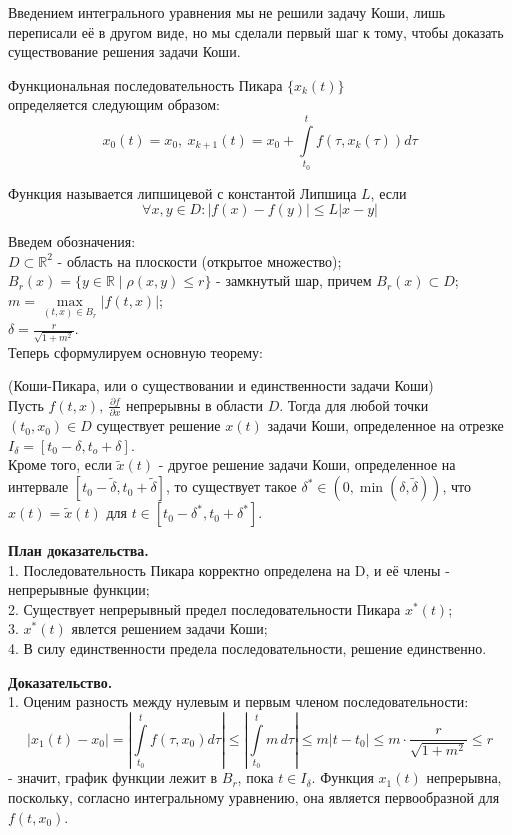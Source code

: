 Введением интегрального уравнения мы не решили задачу Коши, лишь
переписали её в другом виде, но мы сделали первый шаг к тому, чтобы 
доказать существование решения задачи Коши.
\begin{defin}
Функциональная последовательность Пикара $\{x_k(t)\}$\\
определяется следующим образом:  
$$x_0(t)=x_0,~x_{k+1}(t)=x_0+\int\limits_{t_0}^{t}f(\tau,x_k(\tau))d\tau$$
\end{defin}
\begin{defin}
Функция называется липшицевой с константой Липшица $L$, если
 $$\forall x,y \in D:|f(x)-f(y)|\leqslant L|x-y|$$
\end{defin}
Введем обозначения:\\
$D\subset \mathbb{R}^2$ - область на плоскости (открытое множество);\\
$B_r(x)=\{y\in \mathbb{R}\mid \rho(x,y)\leqslant r\}$ - замкнутый шар, причем
$B_r(x)\subset D$;\\
$m=\max\limits_{(t,x)\in B_r}|f(t,x)|$;\\
$\delta = \frac{r}{\sqrt{1+m^2}}$.\\
Теперь сформулируем основную теорему:
\begin{theor} (Коши-Пикара, или о существовании и единственности задачи 
Коши)\\
Пусть $f(t,x),~\frac{\partial f}{\partial x}$ непрерывны в области $D$. 
Тогда для любой точки $(t_0,x_0)\in D$ существует решение
$x(t)$ задачи Коши, определенное на отрезке 
$I_\delta=[t_0-\delta,t_o+\delta]$.\\
Кроме того, если $\tilde x(t)$ - другое решение задачи Коши, определенное
на интервале $[t_0-\tilde\delta,t_0+\tilde\delta]$, то существует такое
$\delta^*\in (0,\min(\delta,\tilde\delta))$, что $x(t)=\tilde x(t)$ 
для $t\in [t_0-\delta^*,t_0+\delta^*]$.
\end{theor}

\textbf{План доказательства.}\\
1. Последовательность Пикара корректно определена на D,
и её члены - непрерывные функции;\\
2. Существует непрерывный предел последовательности Пикара $x^*(t)$;\\
3. $x^*(t)$ явлется решением задачи Коши;\\
4. В силу единственности предела последовательности, решение единственно.  

\textbf{Доказательство.}\\
1. Оценим разность между нулевым и первым членом последовательности:
$$|x_1(t)-x_0|=
\left| \int\limits_{t_0}^{t}f(\tau,x_0)d\tau\right|\leqslant 
\left|\int\limits_{t_0}^{t}m\,d\tau\right|\leqslant m|t-t_0|\leqslant
m\cdot \frac{r}{\sqrt{1+m^2}}\leqslant r$$
- значит, график функции лежит в $B_r$, пока  $t\in I_\delta$. 
Функция $x_1(t)$ непрерывна, поскольку, согласно интегральному уравнению,
она является первообразной для $f(t,x_0)$. 

